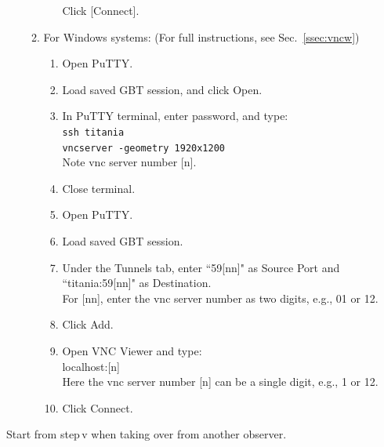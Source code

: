 \documentclass[11pt, reqno, tbtags]{article}
\begin{document}
\begin{enumerate}
\begin{enumerate}
\begin{itemize}
   Click [Connect].
  \end{itemize}

  \item\label{st:win} %
  For Windows systems: (For full instructions, see Sec.~\ref{ssec:vncw})

  \begin{enumerate}
   \item Open PuTTY.
   \item Load saved GBT session, and click Open.
   \item In PuTTY terminal, enter password, and type: \\
   \texttt{ssh titania\\
   vncserver -geometry 1920x1200}\\
   Note vnc server number [n]. 
   \item Close terminal. 
   \item\label{st:op1} Open PuTTY.
   \item Load saved GBT session.
   \item Under the Tunnels tab, enter ``59[nn]" as Source Port and ``titania:59[nn]" as Destination. \\    
   For [nn], enter the vnc server number as two digits, e.g., 01 or 12.
   \item Click Add.
   \item Open VNC Viewer and type:\\
   localhost:[n]\\
   Here the vnc server number [n] can be a single digit, e.g., 1 or 12. 
   \item Click Connect.
  \end{enumerate}
 \end{enumerate}
\end{enumerate}

  Start from step\,v when taking over from another observer.
 
\end{document}
